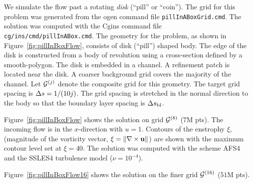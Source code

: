 We simulate the flow past a rotating {\em disk} (``pill'' or ``coin'').
The grid for this problem was generated from the ogen command file {\tt pillInABoxGrid.cmd}.
The solution was computed with the Cgins command file {\tt cg/ins/cmd/pillInABox.cmd}.
The geometry for the problem, as shown in Figure~\ref{fig:pillInBoxFlow},
consists of disk (``pill'') shaped body. The edge of the disk is  constructed from a body of revolution 
using a cross-section defined by a smooth-polygon.
The disk is embedded in a channel. A refinement patch is located near the disk. A coarser background grid
covers the majority of the channel.
Let ${\mathcal G}^{(j)}$ denote the composite grid for this geometry. The target grid spacing is $\Delta s=1/(10 j)$.
The grid spacing is stretched in the normal direction to the body so that the boundary layer
spacing is $\Delta s_{\rm bl}$. 



Figure~\ref{fig:pillInBoxFlow} shows the solution on grid ${\mathcal G}^{(8)}$ ($7$M pts). 
The incoming flow is in the $x$-direction with $u=1$.
Contours of the enstrophy $\xi$, (magnitude of the vorticity vector, $\xi=\| \nabla\times \mathbf{ u}\|$) are shown
with the maximum contour level set at $\xi=40$. 
The solution was computed with the scheme AFS4 and the SSLES4 turbulence model ($\nu=10^{-4}$). 


Figure~\ref{fig:pillInBoxFlow16} shows the solution on the finer grid ${\mathcal G}^{(16)}$ ($51$M pts).

